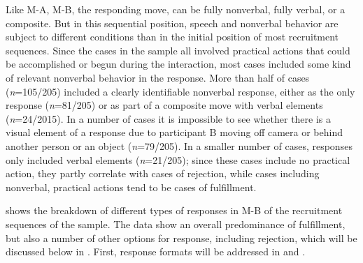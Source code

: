 \documentclass[output=paper]{langsci/langscibook}
\begin{document}
Like M-A, M-B, the responding move, can be fully nonverbal, fully verbal, or a composite. But in this sequential position, speech and nonverbal behavior are subject to different conditions than in the initial position of most recruitment sequences. Since the cases in the sample all involved practical actions that could be accomplished or begun during the interaction, most cases included some kind of relevant nonverbal behavior in the response. More than half of cases (\textit{n}=105/205) included a clearly identifiable nonverbal response, either as the only response (\textit{n}=81/205) or as part of a composite move with verbal elements (\textit{n}=24/2015). In a number of cases it is impossible to see whether there is a visual element of a response due to participant B moving off camera or behind another person or an object (\textit{n}=79/205). In a smaller number of cases, responses only included verbal elements (\textit{n}=21/205); since these cases include no practical action, they partly correlate with cases of rejection, while cases including nonverbal, practical actions tend to be cases of fulfillment.

\begin{table}
\caption{Fulfillment, rejection, and other response types in the Cha'palaa sample.}
\label{tab:floyd:5}
\end{table}

 shows the breakdown of different types of responses in M-B of the recruitment sequences of the sample. The data show an overall predominance of fulfillment, but also a number of other options for response, including rejection, which will be discussed below in . First, response formats will be addressed in  and .
\end{document}
